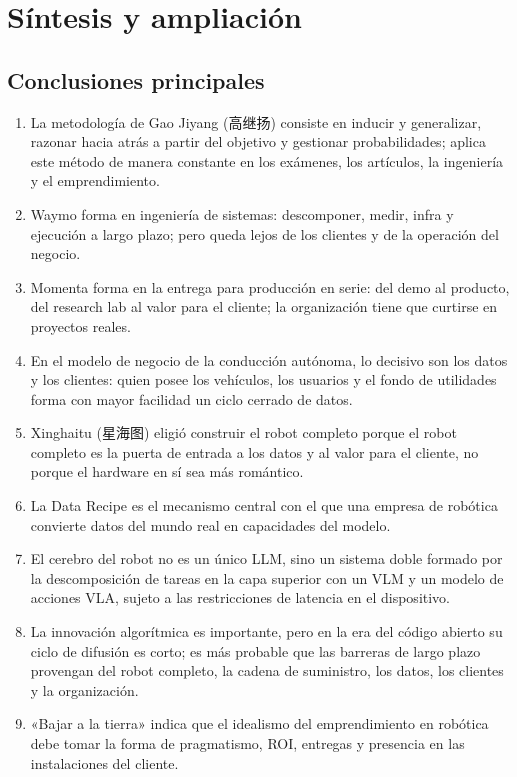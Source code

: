 \section{Síntesis y ampliación}

\subsection{Conclusiones principales}

\begin{enumerate}
\item La metodología de Gao Jiyang (高继扬) consiste en inducir y generalizar, razonar hacia atrás a partir del objetivo y gestionar probabilidades; aplica este método de manera constante en los exámenes, los artículos, la ingeniería y el emprendimiento.
\item Waymo forma en ingeniería de sistemas: descomponer, medir, infra y ejecución a largo plazo; pero queda lejos de los clientes y de la operación del negocio.
\item Momenta forma en la entrega para producción en serie: del demo al producto, del research lab al valor para el cliente; la organización tiene que curtirse en proyectos reales.
\item En el modelo de negocio de la conducción autónoma, lo decisivo son los datos y los clientes: quien posee los vehículos, los usuarios y el fondo de utilidades forma con mayor facilidad un ciclo cerrado de datos.
\item Xinghaitu (星海图) eligió construir el robot completo porque el robot completo es la puerta de entrada a los datos y al valor para el cliente, no porque el hardware en sí sea más romántico.
\item La Data Recipe es el mecanismo central con el que una empresa de robótica convierte datos del mundo real en capacidades del modelo.
\item El cerebro del robot no es un único LLM, sino un sistema doble formado por la descomposición de tareas en la capa superior con un VLM y un modelo de acciones VLA, sujeto a las restricciones de latencia en el dispositivo.
\item La innovación algorítmica es importante, pero en la era del código abierto su ciclo de difusión es corto; es más probable que las barreras de largo plazo provengan del robot completo, la cadena de suministro, los datos, los clientes y la organización.
\item «Bajar a la tierra» indica que el idealismo del emprendimiento en robótica debe tomar la forma de pragmatismo, ROI, entregas y presencia en las instalaciones del cliente.
\end{enumerate}

